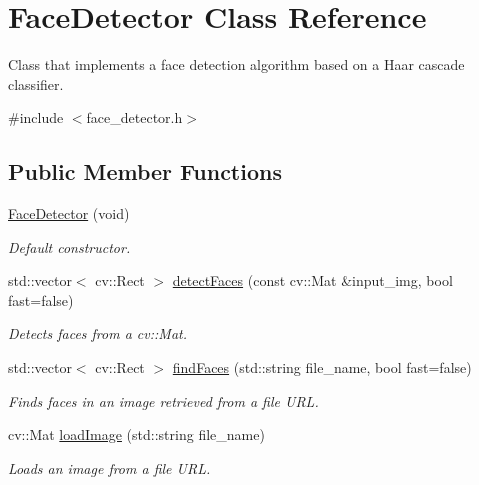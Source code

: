 \hypertarget{classFaceDetector}{\section{Face\-Detector Class Reference}
\label{classFaceDetector}
}


Class that implements a face detection algorithm based on a Haar cascade classifier.  




{\ttfamily \#include $<$face\-\_\-detector.\-h$>$}

\subsection*{Public Member Functions}
\begin{DoxyCompactItemize}
\item 
\hyperlink{classFaceDetector_af08a8c38a26b029e02e05d8d9498332c}{Face\-Detector} (void)
\begin{DoxyCompactList}\small\item\em Default constructor. \end{DoxyCompactList}\item 
std\-::vector$<$ cv\-::\-Rect $>$ \hyperlink{classFaceDetector_a154988581f876e3a15f59c57c4420df8}{detect\-Faces} (const cv\-::\-Mat \&input\-\_\-img, bool fast=false)
\begin{DoxyCompactList}\small\item\em Detects faces from a cv\-::\-Mat. \end{DoxyCompactList}\item 
std\-::vector$<$ cv\-::\-Rect $>$ \hyperlink{classFaceDetector_a590b5ba361a049b2b93d63ebb7518647}{find\-Faces} (std\-::string file\-\_\-name, bool fast=false)
\begin{DoxyCompactList}\small\item\em Finds faces in an image retrieved from a file U\-R\-L. \end{DoxyCompactList}\item 
cv\-::\-Mat \hyperlink{classFaceDetector_ad8223498ebc15a177485f86274583d81}{load\-Image} (std\-::string file\-\_\-name)
\begin{DoxyCompactList}\small\item\em Loads an image from a file U\-R\-L. \end{DoxyCompactList}\end{DoxyCompactItemize}
